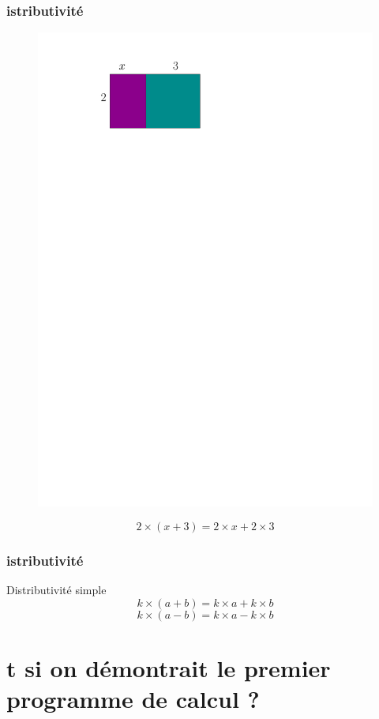 \documentclass{beamer}
\begin{document}
\begin{frame}
  \frametitle{ istributivité}

  \begin{figure}[H]
    \centering
    \includegraphics[width=0.6\linewidth]{sources/1/simple-distri.pdf}
  \end{figure}

  $$2 \times (x + 3) = 2 \times x + 2 \times 3 $$

\end{frame}


\begin{frame}
  \frametitle{ istributivité}
  \begin{alertblock}{Distributivité  simple}
    $$k \times (a + b) = k \times a + k \times b $$
    $$k \times (a - b) = k \times a - k \times b $$ 
  \end{alertblock}
\end{frame}

\section{ t si on démontrait le premier programme de calcul ?}
\end{document}
